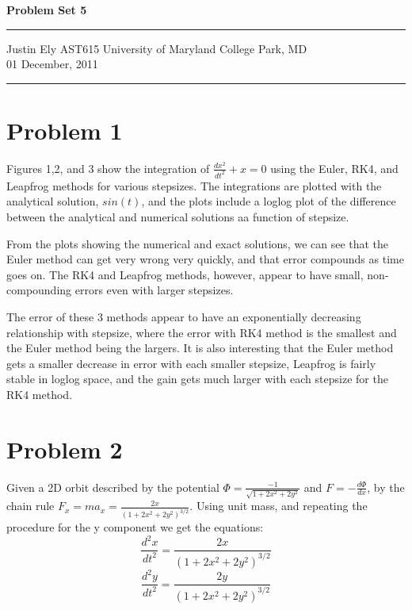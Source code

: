 \documentclass[a4paper,11pt]{article}
\begin{document}
\begin{flushright}

\vspace{1.1cm}

{\bf\Huge Problem Set 5}

\rule{0.25\linewidth}{0.5pt}

\vspace{0.5cm}
Justin Ely
\linebreak
\newline
\footnotesize{AST615 University of Maryland College Park, MD\\}
\vspace{0.5cm}
01 December, 2011
\end{flushright}

\noindent\rule{\linewidth}{1.0pt}
\section*{Problem 1}
Figures 1,2, and 3 show the integration of $\frac{dx^2}{dt^2}+x=0$ using the Euler, RK4, and Leapfrog methods for various stepsizes.  The integrations are plotted with the analytical solution, $sin(t)$, and the plots include a loglog plot of the difference between the analytical and numerical solutions aa function of stepsize. 
 
From the plots showing the numerical and exact solutions, we can see that the Euler method can get very wrong very quickly, and that error compounds as time goes on.  The RK4 and Leapfrog methods, however, appear to have small, non-compounding errors even with larger stepsizes.  

The error of these 3 methods appear to have an exponentially decreasing relationship with stepsize, where the error with RK4 method is the smallest and the Euler method being the largers.  It is also interesting that the Euler method gets a smaller decrease in error with each smaller stepsize, Leapfrog is fairly stable in loglog space, and the gain gets much larger with each stepsize for the RK4 method.


\section*{Problem 2}
Given a 2D orbit described by the potential $\Phi=\frac{-1}{\sqrt{1+2x^2+2y^2}}$ and $F=-\frac{d\Phi}{dx}$, by the chain rule $F_x=ma_x=\frac{2x}{(1+2x^2+2y^2)^{3/2}}$.  Using unit mass, and repeating the procedure for the y component we get the equations:
\begin{equation}
\frac{d^2x}{dt^2}=\frac{2x}{(1+2x^2+2y^2)^{3/2}}
\end{equation}
\begin{equation}
\frac{d^2y}{dt^2}=\frac{2y}{(1+2x^2+2y^2)^{3/2}}
\end{equation}
\end{document}
